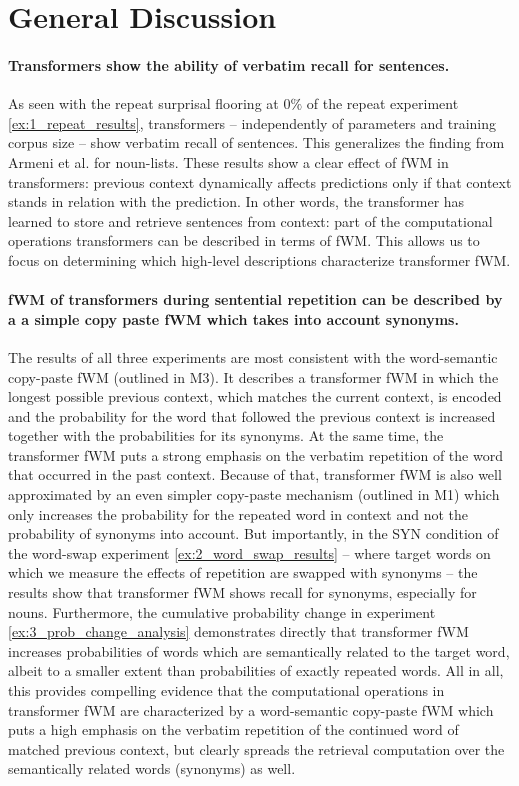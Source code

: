 \section{General Discussion}

\paragraph{Transformers show the ability of verbatim recall for sentences.} As seen with the repeat surprisal flooring at $0\%$ of the repeat experiment \ref{ex:1_repeat_results}, transformers -- independently of parameters and training corpus size -- show verbatim recall of sentences.
This generalizes the finding from Armeni et al. for noun-lists.
These results show a clear effect of fWM in transformers: previous context dynamically affects predictions only if that context stands in relation with the prediction.
In other words, the transformer has learned to store and retrieve sentences from context: part of the computational operations transformers can be described in terms of fWM.
This allows us to focus on determining which high-level descriptions characterize transformer fWM.

\paragraph{fWM of transformers during sentential repetition can be described by a a simple copy paste fWM which takes into account synonyms.}
The results of all three experiments are most consistent with the word-semantic copy-paste fWM (outlined in M3).
It describes a transformer fWM in which the longest possible previous context, which matches the  current context, is encoded and the probability for the word that followed the previous context is increased together with the probabilities for its synonyms.
At the same time, the transformer fWM puts a strong emphasis on the verbatim repetition of the word that occurred in the past context.
Because of that, transformer fWM is also well approximated by an even simpler copy-paste mechanism (outlined in M1) which only increases the probability for the repeated word in context and not the probability of synonyms into account.
But importantly, in the SYN condition of the word-swap experiment \ref{ex:2_word_swap_results} -- where target words on which we measure the effects of repetition are swapped with synonyms -- the results show that transformer fWM shows recall for synonyms, especially for nouns.
Furthermore, the cumulative probability change in experiment \ref{ex:3_prob_change_analysis} demonstrates directly that transformer fWM increases probabilities of words which are semantically related to the target word, albeit to a smaller extent than probabilities of exactly repeated words.
All in all, this provides compelling evidence that the computational operations in transformer fWM are characterized by a word-semantic copy-paste fWM which puts a high emphasis on the verbatim repetition of the continued word of matched previous context, but clearly spreads the retrieval computation over the semantically related words (synonyms) as well.

